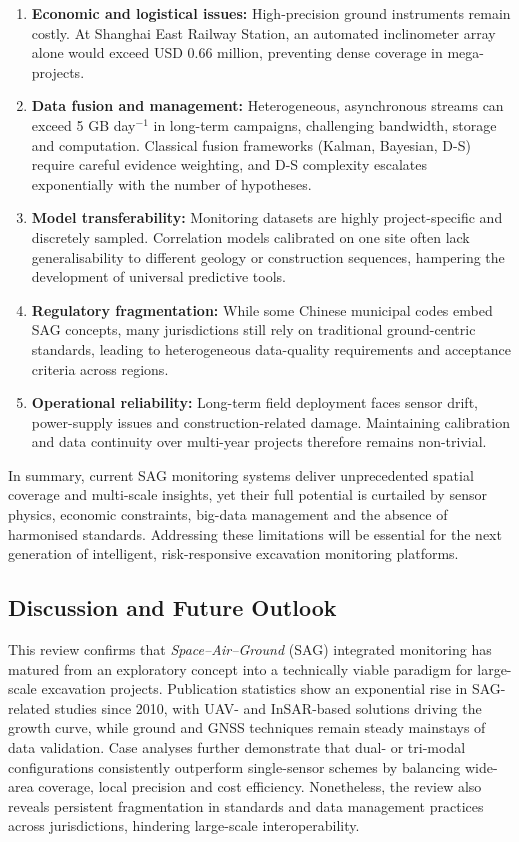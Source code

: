 \documentclass[preprint,11pt,authoryear,3p]{elsarticle}
\begin{document}
\begin{enumerate}
    \item \textbf{Economic and logistical issues:} High-precision ground instruments remain costly. At Shanghai East Railway Station, an automated inclinometer array alone would exceed USD 0.66 million, preventing dense coverage in mega-projects.
    \item \textbf{Data fusion and management:} Heterogeneous, asynchronous streams can exceed 5 GB day$^{-1}$ in long-term campaigns, challenging bandwidth, storage and computation. Classical fusion frameworks (Kalman, Bayesian, D-S) require careful evidence weighting, and D-S complexity escalates exponentially with the number of hypotheses.
    \item \textbf{Model transferability:} Monitoring datasets are highly project-specific and discretely sampled. Correlation models calibrated on one site often lack generalisability to different geology or construction sequences, hampering the development of universal predictive tools.
    \item \textbf{Regulatory fragmentation:} While some Chinese municipal codes embed SAG concepts, many jurisdictions still rely on traditional ground-centric standards, leading to heterogeneous data-quality requirements and acceptance criteria across regions.
    \item \textbf{Operational reliability:} Long-term field deployment faces sensor drift, power-supply issues and construction-related damage. Maintaining calibration and data continuity over multi-year projects therefore remains non-trivial.
\end{enumerate}

In summary, current SAG monitoring systems deliver unprecedented spatial coverage and multi-scale insights, yet their full potential is curtailed by sensor physics, economic constraints, big-data management and the absence of harmonised standards. Addressing these limitations will be essential for the next generation of intelligent, risk-responsive excavation monitoring platforms.

\subsection{Discussion and Future Outlook}

This review confirms that \textit{Space--Air--Ground} (SAG) integrated monitoring has matured from an exploratory concept into a technically viable paradigm for large-scale excavation projects. Publication statistics show an exponential rise in SAG-related studies since 2010, with UAV- and InSAR-based solutions driving the growth curve, while ground and GNSS techniques remain steady mainstays of data validation.  Case analyses further demonstrate that dual- or tri-modal configurations consistently outperform single-sensor schemes by balancing wide-area coverage, local precision and cost efficiency.  Nonetheless, the review also reveals persistent fragmentation in standards and data management practices across jurisdictions, hindering large-scale interoperability.
\end{document}
